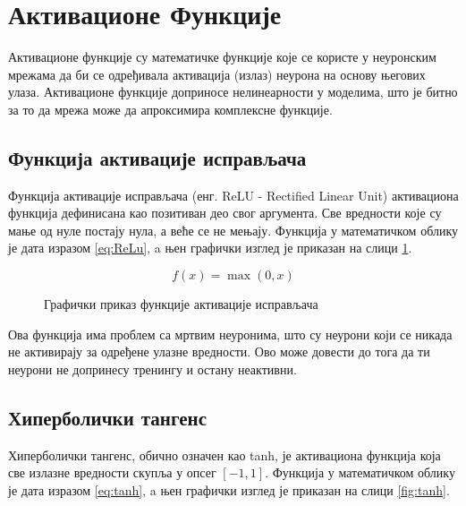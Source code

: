 \documentclass[a4paper, 12pt, master, utf8]{etf}
\begin{document}
\section{Активационе Функције}
\label{sec:24}
Активационе функције су математичке функције које се користе у неуронским мрежама да би се одређивала активација (излаз) 
неурона на основу његових улаза. Активационе функције доприносе нелинеарности у моделима, што је битно за то да мрежа може да апроксимира комплексне функције.

\subsection{Функција активације исправљача}
\label{sec:241}

Функција активације исправљача (енг.  ReLU - Rectified Linear Unit) активациона функција дефинисана као позитиван део свог аргумента. Све вредности које су мање 
од нуле постају нула, а веће се не мењају. Функција у математичком облику је дата изразом \ref{eq:ReLu}, a њен графички изглед је приказан на слици \ref{fig:relu}.

\begin{equation}
    f(x) = \max(0, x)
    \label{eq:ReLu}
\end{equation}

\begin{figure}[h]
    \centering
    \caption{Графички приказ функције активације исправљача}
    \label{fig:relu}
\end{figure}

Ова функција има проблем са мртвим неуронима, што су неурони који се никада не активирају за одређене улазне вредности. 
Ово може довести до тога да ти неурони не допринесу тренингу и остану неактивни.

\subsection{Хиперболички тангенс}
\label{sec:242}
Хиперболички тангенс, обично означен као tanh, је активациона функција која све излазне вредности скупља у опсег $[-1, 1]$.
Функција у математичком облику је дата изразом \ref{eq:tanh}, a њен графички изглед је приказан на слици \ref{fig:tanh}.
\end{document}
